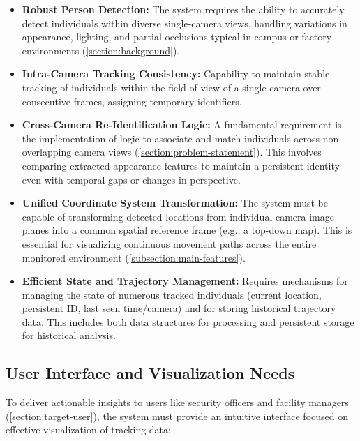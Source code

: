 \begin{itemize}[leftmargin=80pt]
    \item \textbf{Robust Person Detection:} The system requires the ability to accurately detect individuals within diverse single-camera views, handling variations in appearance, lighting, and partial occlusions typical in campus or factory environments (\ref{section:background}).
    \item \textbf{Intra-Camera Tracking Consistency:} Capability to maintain stable tracking of individuals within the field of view of a single camera over consecutive frames, assigning temporary identifiers.
    \item \textbf{Cross-Camera Re-Identification Logic:} A fundamental requirement is the implementation of logic to associate and match individuals across non-overlapping camera views (\ref{section:problem-statement}). This involves comparing extracted appearance features to maintain a persistent identity even with temporal gaps or changes in perspective.
    \item \textbf{Unified Coordinate System Transformation:} The system must be capable of transforming detected locations from individual camera image planes into a common spatial reference frame (e.g., a top-down map). This is essential for visualizing continuous movement paths across the entire monitored environment (\ref{subsection:main-features}).
    \item \textbf{Efficient State and Trajectory Management:} Requires mechanisms for managing the state of numerous tracked individuals (current location, persistent ID, last seen time/camera) and for storing historical trajectory data. This includes both data structures for processing and persistent storage for historical analysis.
\end{itemize}

\subsection{User Interface and Visualization Needs}
\label{subsection:user-interface-visualization}
To deliver actionable insights to users like security officers and facility managers (\ref{section:target-user}), the system must provide an intuitive interface focused on effective visualization of tracking data:

